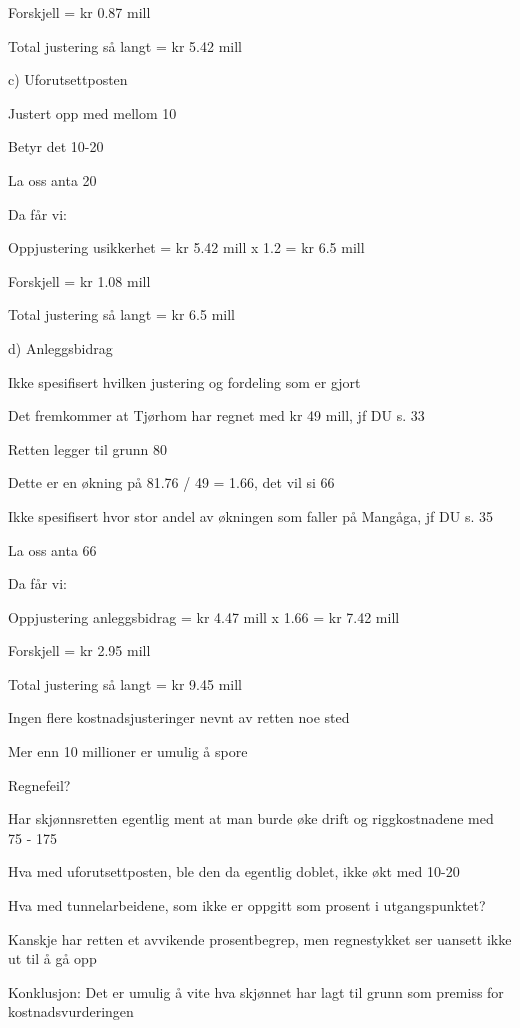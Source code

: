 \documentclass[12pt,a4paper]{article} %
\begin{document}
	Forskjell = kr 0.87 mill

	Total justering så langt = kr 5.42 mill

c)	Uforutsettposten

	Justert opp med mellom 10 %

	Betyr det 10-20 %

	La oss anta 20 %

	Da får vi:

	Oppjustering usikkerhet = kr 5.42 mill x 1.2 = kr 6.5 mill

	Forskjell = kr 1.08 mill

	Total justering så langt = kr 6.5 mill

d)	Anleggsbidrag

	Ikke spesifisert hvilken justering og fordeling som er gjort

	Det fremkommer at Tjørhom har regnet med kr 49 mill, jf DU s. 33

	Retten legger til grunn 80 %

	Dette er en økning på 81.76 / 49 = 1.66, det vil si 66 %

	Ikke spesifisert hvor stor andel av økningen som faller på Mangåga, jf DU s. 35

	La oss anta 66 %

	Da får vi:

	Oppjustering anleggsbidrag = kr 4.47 mill x 1.66 = kr 7.42 mill

	Forskjell = kr 2.95 mill

	Total justering så langt = kr 9.45 mill

	Ingen flere kostnadsjusteringer nevnt av retten noe sted

	Mer enn 10 millioner er umulig å spore

	Regnefeil?

	Har skjønnsretten egentlig ment at man burde øke drift og riggkostnadene med 75 - 175 %

	Hva med uforutsettposten, ble den da egentlig doblet, ikke økt med 10-20 %

	Hva med tunnelarbeidene, som ikke er oppgitt som prosent i utgangspunktet? 

	Kanskje har retten et avvikende prosentbegrep, men regnestykket ser uansett ikke ut til å gå opp

	Konklusjon: Det er umulig å vite hva skjønnet har lagt til grunn som premiss for kostnadsvurderingen
\end{document}
